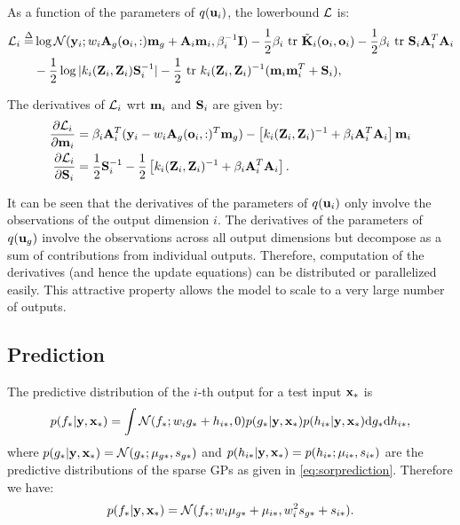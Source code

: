 \documentclass{article} %
\begin{document}
\noindent As a function of the parameters of $q(\u_i)$, the lowerbound $\calL$ is:
\begin{align}
\nonumber
\calL_i \define&
 \log \Normal(\y_i; w_i \A_g(\oi,:) \m_g + \A_i \m_i, \beta_i^{-1} \I)
 - \frac{1}{2} \beta_i \trace \tilde{\K}_i(\oi,\oi)
 - \frac{1}{2} \beta_i \trace \S_i \A_i^T \A_i
 \\
  &- \frac{1}{2} \log |k_i(\Zi,\Zi) \S_i^{-1}| -\frac{1}{2} \trace k_i(\Zi,\Zi)^{-1} (\m_i \m_i^T + \S_i) ,
\end{align}

\noindent The derivatives of $\calL_i$ wrt $\m_i$ and $\S_i$ are given by:
\begin{align}
\deriv{\calL_i}{\m_i}
& = \beta_i \A_i^T (\y_i - w_i \A_g(\oi,:)^T \m_g) - \left[k_i(\Zi,\Zi)^{-1} +  \beta_i \A_i^T \A_i \right] \m_i \\
\deriv{\calL_i}{\S_i} 
&= \frac{1}{2} \S_i^{-1} - \frac{1}{2} \left[ k_i(\Zi,\Zi)^{-1} + \beta_i \A_i^T \A_i \right].
\end{align}

\noindent It can be seen that the derivatives of the parameters of $q(\u_i)$ only involve the observations of the output dimension $i$.
The derivatives of the parameters of $q(\u_g)$ involve the observations across all output dimensions but decompose as a sum of contributions from individual outputs.
Therefore, computation of the derivatives (and hence the update equations) can be distributed or parallelized easily.
This attractive property allows the model to scale to a very large number of outputs.

\subsection{Prediction}
The predictive distribution of the $i$-th output for a test input $\x_*$ is 
\begin{align}
p(\fstar | \y, \x_*) = \int \Normal(\fstar; w_i g_* + h_{i*}, 0) p(g_* | \y, \x_*) p(h_{i*} | \y, \x_*) \der g_* \der h_{i*},
\end{align}
where $p(g_* | \y, \x_*) = \Normal(g_*; \mu_{g*}, s_{g*})$ and $p(h_{i*} | \y, \x_*) = p(h_{i*}; \mu_{i*}, s_{i*})$ are the predictive distributions of the sparse GPs as given in \ref{eq:sorprediction}.
Therefore we have:
\begin{align}
p(\fstar | \y, \x_*) = \Normal(\fstar; w_i \mu_{g*} + \mu_{i*}, w_i^2 s_{g*} + s_{i*}). 
\end{align}
\end{document}

